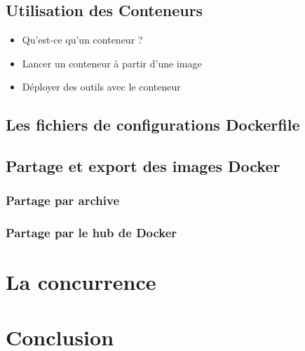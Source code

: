 \documentclass{beamer}
\begin{document}
    \subsection{Utilisation des Conteneurs}
    \begin{frame}
       \begin{itemize}
          \item{Qu'est-ce qu'un conteneur ?}
          \item{Lancer un conteneur à partir d'une image}
          \item{Déployer des outils avec le conteneur}
       \end{itemize}
       \begin{exampleblock}{}
          \em{}
       \end{exampleblock}
    \end{frame}

    \subsection{Les fichiers de configurations Dockerfile}
    \begin{frame}
       \begin{itemize}
       \end{itemize}
    \end{frame}

    \subsection{Partage et export des images Docker}
    \begin{frame}
       \begin{itemize}
       \end{itemize}
    \end{frame}

    \subsubsection{Partage par archive}
    \begin{frame}
    \end{frame}

    \subsubsection{Partage par le hub de Docker}
    \begin{frame}
    \end{frame}


    \section{La concurrence}
    \begin{frame}
    \end{frame}


    \section{Conclusion}
    \begin{frame}
    \end{frame}
\end{document}
